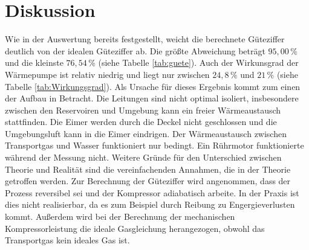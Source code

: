 \section{Diskussion}
\label{sec:Diskussion}
Wie in der Auswertung bereits festgestellt, weicht die berechnete Güteziffer deutlich von der idealen Güteziffer ab.
Die größte Abweichung beträgt $95,00 \, \%$ und die kleinste $76,54 \, \%$ (siehe Tabelle \ref{tab:guete}).
Auch der Wirkunsgrad der Wärmepumpe ist relativ niedrig und liegt nur zwischen $24,8 \, \%$ und $21 \, \%$ (siehe Tabelle \ref{tab:Wirkungsgrad}).
Als Ursache für dieses Ergebnis kommt zum einen der Aufbau in Betracht.
Die Leitungen sind nicht optimal isoliert, insbesondere zwischen den Reservoiren und Umgebung kann ein freier Wärmeaustausch stattfinden.
Die Eimer werden durch die Deckel nicht geschlossen und die Umgebungsluft kann in die Eimer eindrigen.
Der Wärmeaustausch zwischen Transportgas und Wasser funktioniert nur bedingt.
Ein Rührmotor funktionierte während der Messung nicht.
Weitere Gründe für den Unterschied zwischen Theorie und Realität sind die vereinfachenden Annahmen, die in der Theorie getroffen werden.
Zur Berechnung der Güteziffer wird angenommen, dass der Prozess reversibel sei und der Kompressor adiabatisch arbeite.
In der Praxis ist dies nicht realisierbar, da es zum Beispiel durch Reibung zu Engergieverlusten kommt.
Außerdem wird bei der Berechnung der mechanischen Kompressorleistung die ideale Gasgleichung herangezogen, obwohl das Transportgas kein ideales Gas ist.
